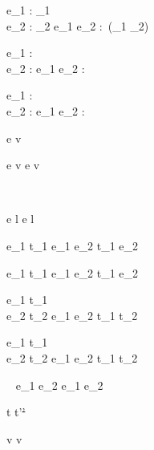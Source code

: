   {\Gamma\St{} \infers e_1 : \Task \tau_1 \\
   \Gamma\St{} \infers e_2 : \Task \tau_2}
  {\Gamma\St{} \infers e_1 \And e_2 : \Task\,(\tau_1 \times \tau_2)}


  {\Gamma\St{} \infers e_1 : \Task \tau \\
   \Gamma\St{} \infers e_2 : \Task \tau }
  {\Gamma\St{} \infers e_1 \Or e_2 : \Task \tau}


  {\Gamma\St{} \infers e_1 : \Task \tau \\
   \Gamma\St{} \infers e_2 : \Task \tau }
  {\Gamma\St{} \infers e_1 \Xor e_2 : \Task \tau}





  {e \evaluate v}


  {e \evaluate v}
  {\Edit e \evaluate \Edit v}

  {\ }
  {\Enter \beta \evaluate \Enter \beta}

  {e \evaluate l}
  {\Update e \evaluate \Update l}


  { }
  {\Fail \evaluate \Fail}


  {e_1 \evaluate t_1}
  {e_1 \Then e_2 \evaluate t_1 \Then e_2}

  {e_1 \evaluate t_1}
  {e_1 \Next e_2 \evaluate t_1 \Next e_2}


  {e_1 \evaluate t_1 \\
   e_2 \evaluate t_2}
  {e_1 \And e_2 \evaluate t_1 \And t_2}


  {e_1 \evaluate t_1 \\
   e_2 \evaluate t_2}
  {e_1 \Or e_2 \evaluate t_1 \Or t_2}

  {\ }
  {e_1 \Xor e_2 \evaluate e_1 \Xor e_2}







  {t\st{} \normalise t'\st{'}}


  { }
  {\Edit v\st{} \normalise \Edit v\st{}}

  { }
  {\Enter \beta\st{} \normalise \Enter \beta\st{}}

